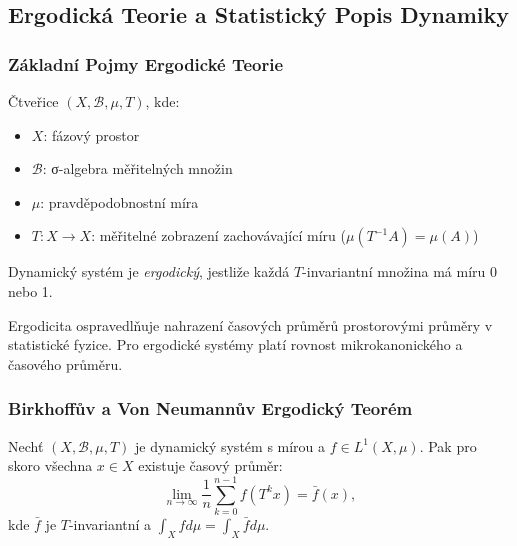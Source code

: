 \spc

\subsection{Ergodická Teorie a Statistický Popis Dynamiky}

\subsubsection{Základní Pojmy Ergodické Teorie}

\begin{definition}
Čtveřice $(X, \mathcal{B}, \mu, T)$, kde:
\begin{itemize}
\item $X$: fázový prostor
\item $\mathcal{B}$: σ-algebra měřitelných množin
\item $\mu$: pravděpodobnostní míra
\item $T: X \to X$: měřitelné zobrazení zachovávající míru ($\mu(T^{-1}A) = \mu(A)$)
\end{itemize}
\end{definition}

\begin{definition}[Ergodicita]
Dynamický systém je \emph{ergodický}, jestliže každá $T$-invariantní množina má míru 0 nebo 1.
\end{definition}

\begin{application}
Ergodicita ospravedlňuje nahrazení časových průměrů prostorovými průměry v statistické fyzice. Pro ergodické systémy platí rovnost mikrokanonického a časového průměru.
\end{application}

\subsubsection{Birkhoffův a Von Neumannův Ergodický Teorém}

\begin{theorem}
Nechť $(X, \mathcal{B}, \mu, T)$ je dynamický systém s mírou a $f \in L^1(X, \mu)$. Pak pro skoro všechna $x \in X$ existuje časový průměr:
\[
\lim_{n \to \infty} \frac{1}{n} \sum_{k=0}^{n-1} f(T^k x) = \bar{f}(x),
\]
kde $\bar{f}$ je $T$-invariantní a $\int_X f d\mu = \int_X \bar{f} d\mu$.
\end{theorem}

